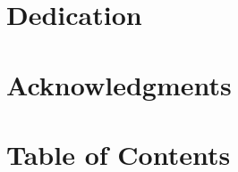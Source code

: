 \documentclass{thesis-library}
\begin{document}
\newcommand{\thesisTitle}{[Thesis Title]}
\newcommand{\byLabel}{By:}
\newcommand{\studentName}{[Student Name]}
\newcommand{\authornumber}{[Student Number]}
\newcommand{\supervisorLabel}{Supervisor:}
\newcommand{\supervisorName}{[Supervisor Name]}
\newcommand{\coSupervisorLabel}{Co-Supervisor:}
\newcommand{\coSupervisorName}{[Co-Supervisor Name]}
\newcommand{\degreeLineALabel}{This thesis proposal was submitted in Partial Fulfillment of the}
\newcommand{\degreeLineBLabel}{Requirements for the Master’s Degree}
\newcommand{\majorName}{In Computer Science}
\newcommand{\universityName}{Applied Science Private University}
\newcommand{\deanshipName}{Deanship of Scientific Research and Graduate Studies}
\newcommand{\regionName}{Amman - Jordan}
\newcommand{\degreeyearName}{[2024]}
\newcommand{\degreemonthName}{[September]}

\makecoverpage




\newpage

\newpage


\chapter*{Dedication}
\lipsum[1]

\chapter*{Acknowledgments}
\lipsum[2-3]


\newpage
\listofabbreviations
{}


\newpage
\chapter*{\centering \Huge Table of Contents}
\tableofcontents
{}


\newpage
\listoffiguresname

\newpage
\listoftablesname
\end{document}
